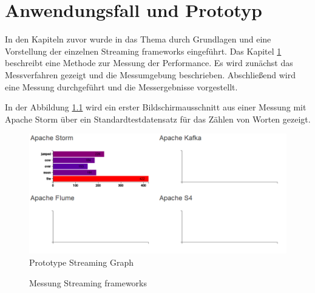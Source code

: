 \chapter{Anwendungsfall und Prototyp}
\label{chapter:prototype}

In den Kapiteln zuvor wurde in das Thema durch Grundlagen und eine Vorstellung der einzelnen Streaming frameworks eingeführt. Das Kapitel \ref{chapter:prototype} beschreibt eine Methode zur Messung der Performance. Es wird zunächst das Messverfahren gezeigt und die Messumgebung beschrieben. Abschließend wird eine Messung durchgeführt und die Messergebnisse vorgestellt.

In der Abbildung \ref{fig:prototypeStreamingGraph} wird ein erster Bildschirmausschnitt aus einer Messung mit Apache Storm über ein Standardtestdatensatz für das Zählen von Worten gezeigt.

\begin{figure}[htb!]
\centering
\includegraphics[width=1.0\textwidth]{bilder/PrototypeStreamingGraph.png}
\caption{Prototype Streaming Graph
\label{fig:prototypeStreamingGraph}}
\end{figure}

\begin{figure}

\caption{Messung Streaming frameworks
\label{fig:messungFrameworks}}
      \end{figure}

